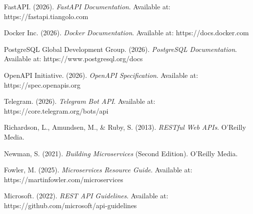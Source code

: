 \begin{enumerate}[label={[\arabic*]}]

\item FastAPI. (2026). \textit{FastAPI Documentation}. Available at: https://fastapi.tiangolo.com

\item Docker Inc. (2026). \textit{Docker Documentation}. Available at: https://docs.docker.com

\item PostgreSQL Global Development Group. (2026). \textit{PostgreSQL Documentation}. Available at: https://www.postgresql.org/docs

\item OpenAPI Initiative. (2026). \textit{OpenAPI Specification}. Available at: https://spec.openapis.org

\item Telegram. (2026). \textit{Telegram Bot API}. Available at: https://core.telegram.org/bots/api

\item Richardson, L., Amundsen, M., \& Ruby, S. (2013). \textit{RESTful Web APIs}. O'Reilly Media.

\item Newman, S. (2021). \textit{Building Microservices} (Second Edition). O'Reilly Media.

\item Fowler, M. (2025). \textit{Microservices Resource Guide}. Available at: https://martinfowler.com/microservices

\item Microsoft. (2022). \textit{REST API Guidelines}. Available at: https://github.com/microsoft/api-guidelines

\end{enumerate}

